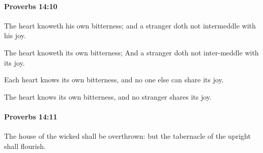 		\paragraph{Proverbs 14:10} %
			\label{PROVERBS-14-10}

			The heart knoweth his own bitterness; and a stranger doth not intermeddle with his joy.

			\begin{versebox}
					\item[BHS] 
					\item[ASV] The heart knoweth its own bitterness; And a stranger doth not inter-meddle with its joy.
					\item[NIV] Each heart knows its own bitterness, and no one else can share its joy.
					\item[NRSV] The heart knows its own bitterness, and no stranger shares its joy.
			\end{versebox}

		\paragraph{Proverbs 14:11} %
			\label{PROVERBS-14-11}

			The house of the wicked shall be overthrown: but the tabernacle of the upright shall flourish.

